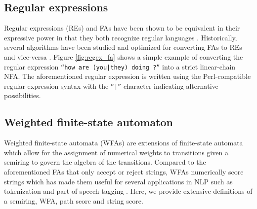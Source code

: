 \subsection{Regular expressions}

Regular expressions (REs) and FAs have been shown to be equivalent in their
expressive power in that they both recognize regular languages
\citep{sipser1996introduction}. Historically, several algorithms have been
studied and optimized for converting FAs to REs and vice-versa
\citep{mcnaughton1960regular,thompson1968programming}. Figure \ref{fig:regex_fa}
shows a simple example of converting the regular expression \texttt{``how are
  (you|they) doing ?''} into a strict linear-chain NFA. The aforementioned
regular expression is written using the Perl-compatible regular expression
syntax with the \texttt{``|''} character indicating alternative possibilities.

\subsection{Weighted finite-state automaton}

Weighted finite-state automata (WFAs) are extensions of finite-state automata
which allow for the assignment of numerical weights to transitions given a
semiring to govern the algebra of the transitions. Compared to
the aforementioned FAs that only accept or reject strings, WFAs numerically
score strings which has made them useful for several applications in NLP such as
tokenization and part-of-speech tagging \citep{maletti2017survey}. Here, we provide
extensive definitions of a semiring, WFA, path score and string score.

